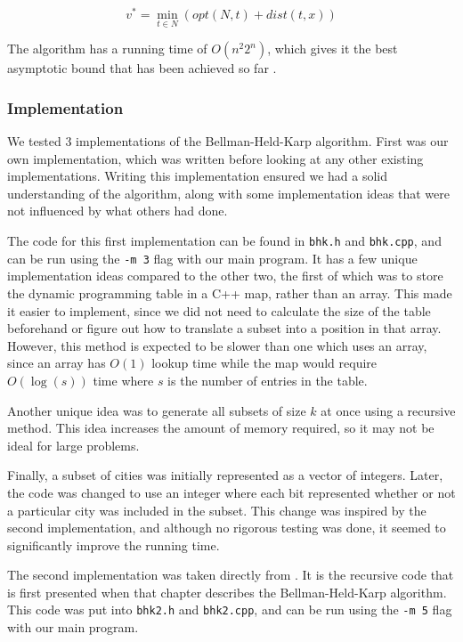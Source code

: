 \documentclass[11pt]{article}
\begin{document}
	\[ v^* = \min_{t \in N} ( opt(N , t) + dist(t, x) ) \]
	
	The algorithm has a running time of $O(n^2 2^n)$, which gives it the best asymptotic bound that has been achieved so far \cite{bico}.
	
	\subsubsection{Implementation}
	
	We tested 3 implementations of the Bellman-Held-Karp algorithm. First was our own implementation, which was written before looking at any other existing implementations. Writing this implementation ensured we had a solid understanding of the algorithm, along with some implementation ideas that were not influenced by what others had done.
	
	The code for this first implementation can be found in \texttt{bhk.h} and \texttt{bhk.cpp}, and can be run using the \texttt{-m 3} flag with our main program. It has a few unique implementation ideas compared to the other two, the first of which was to store the dynamic programming table in a C++ map, rather than an array. This made it easier to implement, since we did not need to calculate the size of the table beforehand or figure out how to translate a subset into a position in that array. However, this method is expected to be slower than one which uses an array, since an array has $O(1)$ lookup time while the map would require $O(\log(s))$ time where $s$ is the number of entries in the table.
	
	Another unique idea was to generate all subsets of size $k$ at once using a recursive method. This idea increases the amount of memory required, so it may not be ideal for large problems.
	
	Finally, a subset of cities was initially represented as a vector of integers. Later, the code was changed to use an integer where each bit represented whether or not a particular city was included in the subset. This change was inspired by the second implementation, and although no rigorous testing was done, it seemed to significantly improve the running time.
	
	The second implementation was taken directly from \cite{bico}. It is the recursive code that is first presented when that chapter describes the Bellman-Held-Karp algorithm. This code was put into \texttt{bhk2.h} and \texttt{bhk2.cpp}, and can be run using the \texttt{-m 5} flag with our main program.
	
\end{document}
